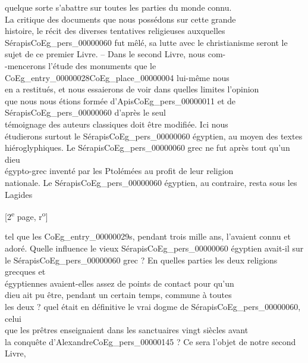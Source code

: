 \documentclass{book}
\begin{document}
quelque sorte s’abattre sur toutes les parties du monde connu.\\
La critique des documents que nous possédons sur cette grande\\
histoire, le récit des diverses tentatives religieuses auxquelles\\
Sérapis\gls{CoEg_pers_00000060} fut mêlé, sa lutte avec le christianisme seront le\\
sujet de ce premier Livre. – Dans le second Livre, nous com-\\
-mencerons l’étude des monuments que le \Gls{CoEg_entry_00000028}\gls{CoEg_place_00000004} lui-même nous\\
en a restitués, et nous essaierons de voir dans quelles limites l’opinion\\
que nous nous étions formée d’Apis\gls{CoEg_pers_00000011} et de Sérapis\gls{CoEg_pers_00000060} d’après le seul\\
témoignage des auteurs classiques doit être modifiée. Ici nous\\
étudierons surtout le Sérapis\gls{CoEg_pers_00000060} égyptien, au moyen des textes\\
hiéroglyphiques. Le Sérapis\gls{CoEg_pers_00000060} grec ne fut après tout qu’un dieu\\
égypto-grec inventé par les Ptolémées au profit de leur religion\\
nationale. Le Sérapis\gls{CoEg_pers_00000060} égyptien, au contraire, resta sous les Lagides
{\footnotesize\begin{center} {[2\textsuperscript{e} page, r\textsuperscript{o}]}\end{center}}
\noindent tel que les \Glspl{CoEg_entry_00000029}, pendant trois mille ans, l’avaient connu et\\
adoré. Quelle influence le vieux Sérapis\gls{CoEg_pers_00000060} égyptien avait-il sur\\
le Sérapis\gls{CoEg_pers_00000060} grec ? En quelles parties les deux religions grecques et\\
égyptiennes avaient-elles assez de points de contact pour qu’un\\
dieu ait pu être, pendant un certain temps, commune à toutes\\
les deux ? quel était en définitive le vrai dogme de Sérapis\gls{CoEg_pers_00000060}, celui\\
que les prêtres enseignaient dans les sanctuaires vingt siècles avant\\
la conquête d’Alexandre\gls{CoEg_pers_00000145} ? Ce sera l’objet de notre second Livre,\\
\end{document}
